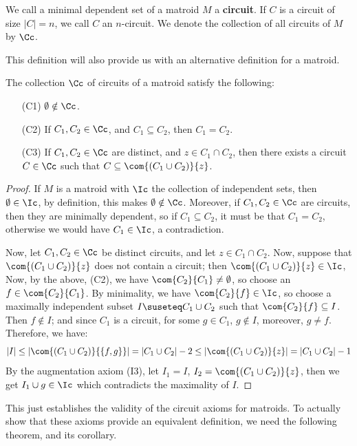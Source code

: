 \begin{definition}
    We call a minimal dependent set of a matroid $M$ a  \textbf{circuit}. If $C$
    is a circuit of size  $|C|=n$, we call  $C$ an  $n$-circuit. We denote the
    collection of all circuits of  $M$ by  $\Cc$.
\end{definition}

This definition will also provide us with an alternative definition for a
matroid.

\begin{lemma}\label{1.1.2}
    The collection $\Cc$ of circuits of a matroid satisfy the following:
    \begin{enumerate}
        \item[(C1)] $\emptyset \notin \Cc$.

        \item[(C2)] If $C_1, C_2 \in \Cc$, and $C_1 \subseteq C_2$, then
            $C_1=C_2$.

        \item[(C3)] If $C_1, C_2 \in \Cc$ are distinct, and $z \in C_1 \cap
            C_2$, then there exists a circuit $C \in \Cc$ such that $C \subseteq
            \com{(C_1 \cup C_2)}{z}$.
    \end{enumerate}
\end{lemma}
\begin{proof}
    If $M$ is a matroid with  $\Ic$ the collection of independent sets, then
    $\emptyset \in \Ic$, by definition, this makes  $\emptyset \notin \Cc$.
    Moreover, if $C_1,C_2 \in \Cc$ are circuits, then they are minimally
    dependent, so if $C_1 \subseteq C_2$, it must be that $C_1=C_2$, otherwise
    we would have $C_1 \in \Ic$, a contradiction.

    Now, let $C_1,C_2 \in \Cc$ be distinct circuits, and let $z \in C_1 \cap
    C_2$. Now, suppose that $\com{(C_1 \cup C_2)}{z}$ does not contain a
    circuit; then $\com{(C_1 \cup C_2)}{z} \in \Ic$, Now, by the above, (C2),
    we have $\com{C_2}{C_1} \neq \emptyset$, so choose an $f \in \com{C_2}{C_1}$.
    By minimality, we have $\com{C_2}{f} \in \Ic$, so choose a maximally
    independent subset $I \suseteq C_1 \cup C_2$ such that $\com{C_2}{f}
    \subseteq I$. Then $f \notin I$; and since  $C_1$ is a circuit, for some $g
    \in C_1$, $g \notin I$, moreover,  $g \neq f$. Therefore, we have:
    \begin{equation*}
        |I| \leq |\com{(C_1 \cup C_2)}{\{f,g\}}|=|C_1 \cup C_2|-2 \leq
        |\com{(C_1 \cup C_2)}{z}|=|C_1 \cup C_2|-1
    \end{equation*}
    By the augmentation axiom (I3), let $I_1=I$, $I_2=\com{(C_1 \cup C_2)}{z}$,
    then we get $I_1 \cup g \in \Ic$ which contradicts the maximality of $I$.
\end{proof}
\begin{remark}
    This just establishes the validity of the circuit axioms for matroids. To
    actually show that these axioms provide an equivalent definition, we need
    the following theorem, and its corollary.
\end{remark}

